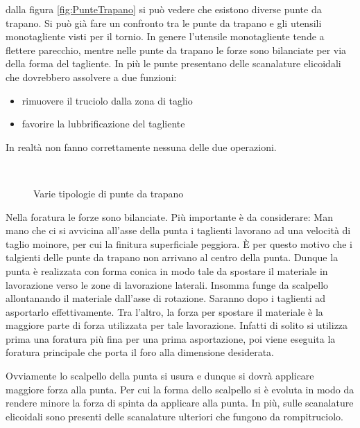 dalla figura \ref{fig:PunteTrapano} si può vedere che esistono diverse punte da trapano.
Si può già fare un confronto tra le punte da trapano e gli utensili
monotagliente visti per il tornio.
In genere l'utensile monotagliente tende a flettere parecchio, mentre nelle punte da trapano 
le forze sono bilanciate per via della forma del tagliente.
In più le punte presentano delle scanalature elicoidali che dovrebbero assolvere
a due funzioni:
\begin{itemize}
\item rimuovere il truciolo dalla zona di taglio
\item favorire la lubbrificazione del tagliente
\end{itemize}
In realtà non fanno correttamente nessuna delle due operazioni.

\begin{figure}
\centering
{}\\
\quad
{}
\caption{Varie tipologie di punte da trapano}
\label{fig:Punte}
\end{figure}

Nella foratura le forze sono bilanciate. Più importante è da considerare:
Man mano che ci si avvicina all'asse della punta i taglienti lavorano ad una velocità di taglio
moinore, per cui la finitura superficiale peggiora.
È per questo motivo che i talgienti delle punte da trapano non arrivano al centro della punta.
Dunque la punta è realizzata con forma conica in modo tale da spostare il materiale in lavorazione 
verso le zone di lavorazione laterali. Insomma funge da scalpello allontanando il materiale
dall'asse di rotazione. Saranno dopo i taglienti ad asportarlo effettivamente. 
Tra l'altro, la forza per spostare il materiale è la maggiore parte di forza utilizzata per tale lavorazione.
Infatti di solito si utilizza prima una foratura più fina per una prima asportazione, poi viene 
eseguita la foratura principale che porta il foro alla dimensione desiderata.

Ovviamente lo scalpello della punta si usura e dunque si dovrà applicare maggiore forza alla punta.
Per cui la forma dello scalpello si è evoluta in modo da rendere minore la forza di spinta da applicare alla 
punta. In più, sulle scanalature elicoidali sono presenti delle scanalature ulteriori che fungono da 
rompitruciolo.

